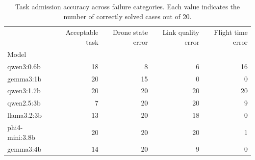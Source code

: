 \begin{table}[t]
\centering
\caption{Task admission accuracy across failure categories. Each value indicates the number of correctly solved cases out of 20.}
\label{tab:task_admission_accuracy}
\begin{tabular}{lrrrr}
\toprule
 & Acceptable task & Drone state error & Link quality error & Flight time error \\
Model &  &  &  &  \\
\midrule
qwen3:0.6b & 18 & 8 & 6 & 16 \\
gemma3:1b & 20 & 15 & 0 & 0 \\
qwen3:1.7b & 20 & 20 & 20 & 20 \\
qwen2.5:3b & 7 & 20 & 20 & 9 \\
llama3.2:3b & 13 & 20 & 18 & 0 \\
phi4-mini:3.8b & 20 & 20 & 20 & 1 \\
gemma3:4b & 14 & 20 & 9 & 0 \\
\bottomrule
\end{tabular}

\end{table}
